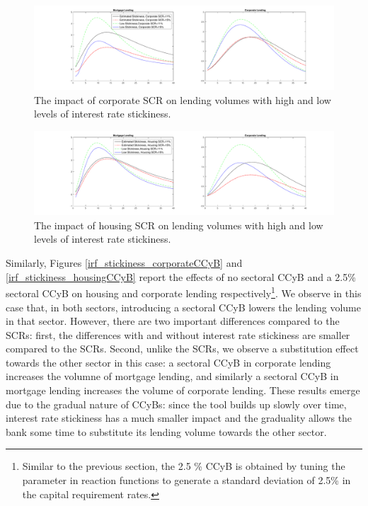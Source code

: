 \documentclass[12pt]{article}
\numberwithin{equation}{section}
\begin{document}
\begin{figure}[H]
\centering
\caption{The impact of corporate SCR on lending volumes with high and low levels of interest rate stickiness. }
\label{irf_stickiness_corpSCR}
\includegraphics[scale=0.35]{stickiness_corporate_SCRECAB.pdf}
\end{figure}

\begin{figure}[H]{}
\centering
\caption{The impact of housing SCR on lending volumes with high and low levels of interest rate stickiness.}
\label{irf_stickiness_housingSCR}
\includegraphics[scale=0.35]{stickiness_housing_SCRECAB.pdf}
\end{figure}


Similarly, Figures \ref{irf_stickiness_corporateCCyB} and \ref{irf_stickiness_housingCCyB} report the effects of no sectoral CCyB and a 2.5\% sectoral CCyB on housing and corporate lending respectively\footnote{Similar to the previous section, the 2.5 \% CCyB is obtained by tuning the parameter in reaction functions to generate a standard deviation of 2.5\% in the capital requirement rates.}. We observe in this case that, in both sectors, introducing a sectoral CCyB lowers the lending volume in that sector. However, there are two important differences compared to the SCRs: first, the differences with and without interest rate stickiness are smaller compared to the SCRs. Second, unlike the SCRs, we observe a substitution effect towards the other sector in this case: a sectoral CCyB in corporate lending increases the volumne of mortgage lending, and similarly a sectoral CCyB in mortgage lending increases the volume of corporate lending. These results emerge due to the gradual nature of CCyBs: since the tool builds up slowly over time, interest rate stickiness has a much smaller impact and the graduality allows the bank some time to substitute its lending volume towards the other sector. 
\end{document}
